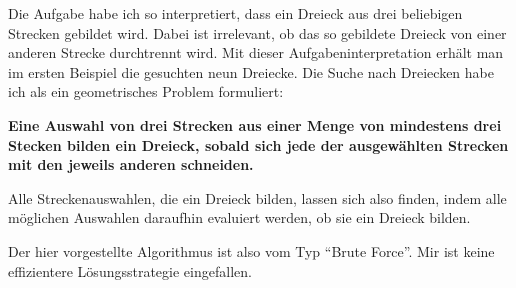 Die Aufgabe habe ich so interpretiert, dass ein Dreieck aus drei beliebigen Strecken gebildet wird. Dabei ist irrelevant, ob das so gebildete Dreieck von einer anderen Strecke durchtrennt wird. Mit dieser Aufgabeninterpretation erhält man im ersten Beispiel die gesuchten neun Dreiecke.
Die Suche nach Dreiecken habe ich als ein geometrisches Problem formuliert:

\textbf{
    Eine Auswahl von drei Strecken aus einer Menge von mindestens drei Stecken bilden ein Dreieck, sobald sich jede der ausgewählten Strecken mit den jeweils anderen schneiden.
}

Alle Streckenauswahlen, die ein Dreieck bilden, lassen sich also finden, indem alle möglichen Auswahlen daraufhin evaluiert werden, ob sie ein Dreieck bilden.

Der hier vorgestellte Algorithmus ist also vom Typ "`Brute Force"'. Mir ist keine effizientere Lösungsstrategie eingefallen.
